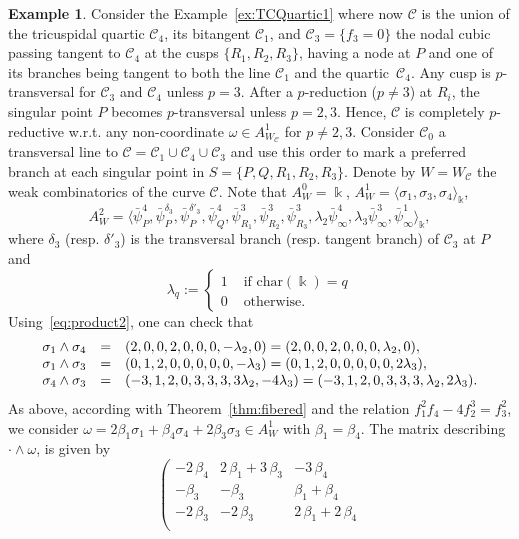 \documentclass[11pt]{amsart}
\def\cC{\mathcal{C}}
\def\kk{\Bbbk}
\def\w{\omega}
\theoremstyle{plain}
\theoremstyle{definition}
\newtheorem{example}[thm]{Example}
\begin{document}
\begin{example}
\label{ex:TCQuartic2}
Consider the Example~\ref{ex:TCQuartic1} where now $\cC$ is the union of the tricuspidal
quartic $\cC_4$, its bitangent $\cC_1$, and $\cC_3=\{f_3=0\}$ the nodal cubic passing tangent to $\cC_4$
at the cusps $\{R_1,R_2,R_3\}$, having a node at $P$ and one of its branches being tangent to both the line $\cC_1$ and the quartic~$\cC_4$. Any cusp is $p$-transversal for $\cC_3$ and $\cC_4$ unless $p=3$. After a $p$-reduction ($p\neq 3$) at $R_i$, the singular point $P$ becomes $p$-transversal unless $p=2,3$. Hence, $\cC$ is completely $p$-reductive w.r.t. any non-coordinate
$\w\in A^1_{W_\cC}$ for $p\neq 2,3$. Consider $\cC_0$ a transversal line to $\cC=\cC_1\cup\cC_4\cup\cC_3$ and use this order
to mark a preferred branch at each singular point in $S=\{P,Q,R_1,R_2,R_3\}$. Denote by $W=W_\cC$ the weak combinatorics of the curve $\cC$. Note that
$A^0_W=\kk$, $A^1_W=\langle \sigma_1,\sigma_3,\sigma_4\rangle_\kk$,
$$A^2_W=\langle\bar\psi_P^4,\bar\psi_P^{\delta_3},\bar\psi_P^{\delta'_3},
\bar\psi_Q^4,\bar\psi_{R_1}^3,\bar\psi_{R_2}^3,\bar\psi_{R_3}^3,
\lambda_2\bar\psi_{\infty}^4,\lambda_3\bar\psi_{\infty}^3, \bar\psi_{\infty}^1\rangle_\kk,$$
where $\delta_3$ (resp. $\delta'_3$) is the transversal branch (resp. tangent branch) of $\cC_3$ at $P$ and
$$\lambda_q:=\begin{cases} 1 & \textrm{ if } \textrm{char}(\kk)=q\\ 0 & \textrm{ otherwise.}\end{cases}$$
Using~\eqref{eq:product2}, one can check that
$$
\array{rcl}
\sigma_1\wedge\sigma_4&=&(2,0,0,2,0,0,0,-\lambda_2,0)=(2,0,0,2,0,0,0,\lambda_2,0),\\
\sigma_1\wedge\sigma_3&=&(0,1,2,0,0,0,0,0,-\lambda_3)=(0,1,2,0,0,0,0,0,2\lambda_3),\\
\sigma_4\wedge\sigma_3&=&(-3,1,2,0,3,3,3,3\lambda_2,-4\lambda_3)=(-3,1,2,0,3,3,3,\lambda_2,2\lambda_3).
\endarray
$$
As above, according with Theorem~\ref{thm:fibered} and the relation $f_1^2f_4-4f_2^3=f_3^2$, we consider
$\omega=2\beta_1\sigma_1+\beta_4\sigma_4+2\beta_3\sigma_3\in A^1_W$ with $\beta_1=\beta_4$. The matrix describing $\cdot\wedge\omega$,
is given by
$$
\left(\begin{array}{rrr}
-2 \, \beta_4 & 2 \, \beta_1 + 3 \, \beta_3 & -3 \, \beta_4 \\
-\beta_3 & -\beta_3 & \beta_1 + \beta_4 \\
-2 \, \beta_3 & -2 \, \beta_3 & 2 \, \beta_1 + 2 \, \beta_4 \\

\end{array}$$
\end{example}
\end{document}
